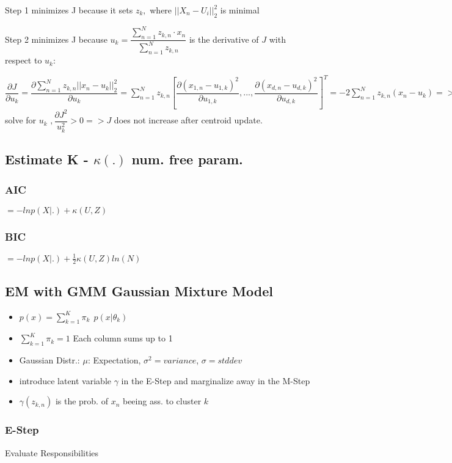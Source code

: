 \documentclass[11pt,twocolumn]{article}
\begin{document}
Step 1 minimizes J because it sets $z_k,$ where $ || X_n - U_i ||^2_2$ is minimal

Step 2 minimizes J because $u_k = \dfrac{\sum_{n=1}^N{z_{k,n} \cdot x_n}}{\sum_{n=1}^N{z_{k,n}}} $ is the derivative of $J$ with respect to $u_k$:

$\dfrac{\partial{J}}{\partial{u_k}} = \dfrac{\partial \sum_{n=1}^N{z_{k,n}} ||x_n - u_k||_2^2}{\partial{u_k}} = \sum_{n=1}^N{z_{k,n}} {\left[  	\dfrac{\partial{(x_{1,n}-u_{1,k})^2}} 	{\partial u_{1,k}}, ...,\dfrac{\partial{(x_{d,n}-u_{d,k})^2}} 	{\partial u_{d,k}}  \right]}^T = -2 \sum_{n=1}^N{z_{k,n}(x_n - u_k)} => $  solve for $u_k$
$, \dfrac{\partial{J^2}}{u_k^2} > 0 => J$ does not increase after centroid update. 

\subsection{Estimate K - $\kappa(.)$ num. free param.}
\subsubsection{AIC} 
$= - ln p(X|.) +\kappa(U,Z)$

\subsubsection{BIC} 
$= - ln p(X|.) + \frac{1}{2} \kappa(U,Z) ln(N)$

\subsection{EM with GMM Gaussian Mixture Model}
\begin{itemize}
\item $p(x) = \sum_{k=1}^{K}{\pi_k~~ p(x|\theta_k)}$
\item $\sum_{k=1}^K{\pi_k}=1$ Each column sums up to 1
\item Gaussian Distr.: $\mu$: Expectation, $\sigma^2 = variance$, $\sigma = stddev$

\item introduce latent variable $\gamma$ in the E-Step and marginalize away in the M-Step
\item $\gamma(z_{k,n})$ is the prob. of $x_n$ beeing ass. to cluster $k$

\end{itemize}

\subsubsection{E-Step} Evaluate Responsibilities
\end{document}
